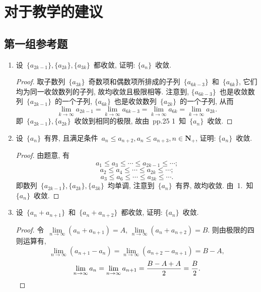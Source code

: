 \documentclass[UTF8,a4paper,10pt,twoside]{book}
\begin{document}
\section{对于教学的建议}
\subsection{第一组参考题}
\begin{enumerate}
	\item 设~$\{a_{2k-1}\}, \{a_{2k}\}, \{a_{3k}\}$~都收敛, 证明: $\{a_n\}$~收敛.
	      \begin{proof}
		      取子数列~$\{a_{3k}\}$~奇数项和偶数项所排成的子列~$\{a_{6k-3}\}$~和~$\{a_{6k}\}$, 它们均为同一收敛数列的子列, 故均收敛且极限相等. 注意到, $\{a_{6k-3}\}$~也是收敛数列~$\{a_{2k-1}\}$~的一个子列, $\{a_{6k}\}$~也是收敛数列~$\{a_{2k}\}$~的一个子列, 从而
		      \[
			      \lim\limits_{k\to\infty} a_{2k-1}=\lim\limits_{k\to\infty} a_{6k-3}=\lim\limits_{k\to\infty} a_{6k}=\lim\limits_{k\to\infty} a_{2k}.
		      \]
		      即~$\{a_{2k-1}\}, \{a_{2k}\}$~收敛到相同的极限, 故由~pp.25 1~知~$\{a_n\}$~收敛. \qedhere
	      \end{proof}

	\item 设~$\{a_n\}$~有界, 且满足条件~$a_n\leqslant a_{n+2}, a_n\leqslant a_{n+3}, n\in\mathbf{N}_{+}$, 证明: $\{a_n\}$~收敛.
	      \begin{proof}
		      由题意, 有
		      \[
			      a_1\leqslant a_3\leqslant\cdots\leqslant a_{2k-1}\leqslant\cdots;
		      \]
		      \[
			      a_2\leqslant a_4\leqslant\cdots\leqslant a_{2k}\leqslant\cdots;
		      \]
		      \[
			      a_3\leqslant a_6\leqslant\cdots\leqslant a_{3k}\leqslant\cdots.
		      \]
		      即数列~$\{a_{2k-1}\}, \{a_{2k}\}, \{a_{3k}\}$~均单调, 注意到~$\{a_n\}$~有界, 故均收敛. 由~1.~知~$\{a_n\}$~收敛.\qedhere
	      \end{proof}

	\item 设~$\{a_n+a_{n+1}\}$~和~$\{a_n+a_{n+2}\}$~都收敛, 证明: $\{a_n\}$~收敛.
	      \begin{proof}
		      令~$\lim\limits_{n\to\infty} (a_n+a_{n+1})=A$, $\lim\limits_{n\to\infty} (a_n+a_{n+2})=B$. 则由极限的四则运算有,
		      \[
			      \lim\limits_{n\to\infty} (a_{n+1}-a_{n})=\lim\limits_{n\to\infty} (a_{n+2}-a_{n+1})=B-A,
		      \]
		      \[
			      \lim\limits_{n\to\infty} a_n=\lim\limits_{n\to\infty} a_{n+1}=\dfrac{B-A+A}{2}=\dfrac{B}{2}.\qedhere
		      \]
	      \end{proof}


\end{enumerate}
\end{document}
